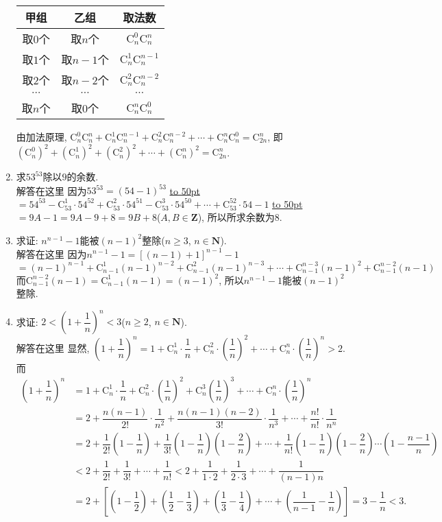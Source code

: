 \documentclass[10pt,a4paper]{article}
\newcommand{\blank}[1]{\underline{\hbox to #1pt{}}}
\begin{document}
\begin{enumerate}[1.]
\begin{center}
\begin{tabular}{|c|c|c|}
        \hline
        甲组 & 乙组 & 取法数\\ \hline
        取$0$个 & 取$n$个 & $\mathrm{C}_n^0\mathrm{C}_n^n$\\ \hline
        取$1$个 & 取$n-1$个 & $\mathrm{C}_n^1\mathrm{C}_n^{n-1}$\\ \hline
        取$2$个 & 取$n-2$个 & $\mathrm{C}_n^2\mathrm{C}_n^{n-2}$\\ \hline
        $\cdots$ & $\cdots$ & $\cdots$\\ \hline
        取$n$个 & 取$0$个 & $\mathrm{C}_n^n\mathrm{C}_n^0$\\ \hline
    \end{tabular}
\end{center}
由加法原理,
$\mathrm{C}_n^0\mathrm{C}_n^n+\mathrm{C}_n^1\mathrm{C}_n^{n-1}+\mathrm{C}_n^2\mathrm{C}_n^{n-2}+\cdots +\mathrm{C}_n^n\mathrm{C}_n^0=\mathrm{C}_{2n}^n$, 即$(\mathrm{C}_n^0)^2+(\mathrm{C}_n^1)^2+(\mathrm{C}_n^2)^2+\cdots +(\mathrm{C}_n^n)^2=\mathrm{C}_{2n}^n$.
\item 求$53^{53}$除以$9$的余数.\\
解答在这里 因为$53^{53}=(54-1)^{53}$
\blank{50}$=54^{53}-\mathrm{C}_{53}^1\cdot 54^{52}+\mathrm{C}_{53}^2\cdot 54^{51}-\mathrm{C}_{53}^3\cdot 54^{50}+\cdots +\mathrm{C}_{53}^{52}\cdot 54-1$
\blank{50}$=9A-1=9A-9+8=9B+8$($A,B\in \mathbf{Z}$),
所以所求余数为8.
\item 求证: $n^{n-1}-1$能被$(n-1)^2$整除($n\ge 3$, $n\in \mathbf{N}$).\\
解答在这里  因为$n^{n-1}-1=[(n-1)+1]^{n-1}-1$
$=(n-1)^{n-1}+\mathrm{C}_{n-1}^1(n-1)^{n-2}+\mathrm{C}_{n-1}^2(n-1)^{n-3}+\cdots +\mathrm{C}_{n-1}^{n-3}(n-1)^2+\mathrm{C}_{n-1}^{n-2}(n-1)$
而$\mathrm{C}_{n-1}^{n-2}(n-1)=\mathrm{C}_{n-1}^1(n-1)=(n-1)^2$, 所以$n^{n-1}-1$能被$(n-1)^2$整除.
\item 求证: $2<(1+\dfrac 1n)^n<3$($n\ge 2$, $n\in \mathbf{N}$).\\
解答在这里  显然, $(1+\dfrac 1n)^n=1+\mathrm{C}_n^1\cdot \dfrac 1n+\mathrm{C}_n^2\cdot (\dfrac 1n)^2+\cdots +\mathrm{C}_n^n\cdot (\dfrac 1n)^n>2$.
而
\begin{align*}(1+\dfrac 1n)^n&=1+\mathrm{C}_n^1\cdot \dfrac 1n+\mathrm{C}_n^2\cdot (\dfrac 1n)^2+\mathrm{C}_n^3(\dfrac 1n)^3+\cdots +\mathrm{C}_n^n\cdot (\dfrac 1n)^n\\ &=2+\dfrac{n(n-1)}{2!}\cdot \dfrac 1{n^2}+\dfrac{n(n-1)(n-2)}{3!}\cdot \dfrac 1{n^3}+\cdots +\dfrac{n!}{n!}\cdot \dfrac 1{n^n}\\ &=2+\dfrac 1{2!}(1-\dfrac 1n)+\dfrac 1{3!}(1-\dfrac 1n)(1-\dfrac 2n)+\cdots+\dfrac 1{n!}(1-\dfrac 1n)(1-\dfrac 2n)\cdots (1-\dfrac{n-1}n) \\ & <2+\dfrac 1{2!}+\dfrac 1{3!}+\cdots +\dfrac 1{n!}<2+\dfrac 1{1\cdot 2}+\dfrac 1{2\cdot 3}+\cdots +\dfrac 1{(n-1)n} \\ &=2+[(1-\dfrac 12)+(\dfrac 12-\dfrac 13)+(\dfrac 13-\dfrac 14)+\cdots +(\dfrac 1{n-1}-\dfrac 1n)]=3-\dfrac 1n<3. 

\end{align*}
\end{enumerate}
\end{document}
